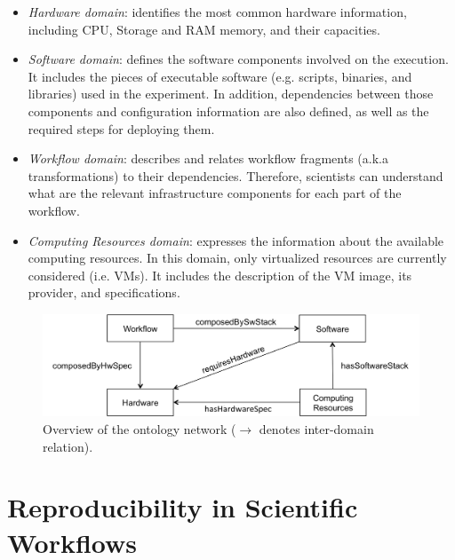 \documentclass[final,5p,times,twocolumn]{elsarticle}
\begin{document}
\begin{itemize}
	\setlength{\itemsep}{1pt}
    \setlength{\parskip}{0pt}
    \setlength{\parsep}{0pt}

	\item{\emph{Hardware domain}}: identifies the most common hardware information, including CPU, Storage and RAM memory, and their capacities.
	
    \item{\emph{Software domain}}: defines the software components involved on the execution. It includes the pieces of executable software (e.g. scripts, binaries, and libraries) used in the experiment. In addition, dependencies between those components and configuration information are also defined, as well as the required steps for deploying them.
	
    \item{\emph{Workflow domain}}: describes and relates workflow fragments (a.k.a transformations) to their dependencies. Therefore, scientists can understand what are the relevant infrastructure components for each part of the workflow.
	
    \item{\emph{Computing Resources domain}}: expresses the information about the available computing resources. In this domain, only virtualized resources are currently considered (i.e. VMs). It includes the description of the VM image, its provider, and specifications.
\end{itemize}

\begin{figure}[!htb]
	\centering
    \includegraphics[width=\linewidth]{figures/wicusrels}
    \caption{Overview of the ontology network ($\rightarrow$ denotes inter-domain relation).}
    \label{fig:wicusrels}
\end{figure}



\section{Reproducibility in Scientific Workflows}
\label{sec:reproducibility}
\end{document}
